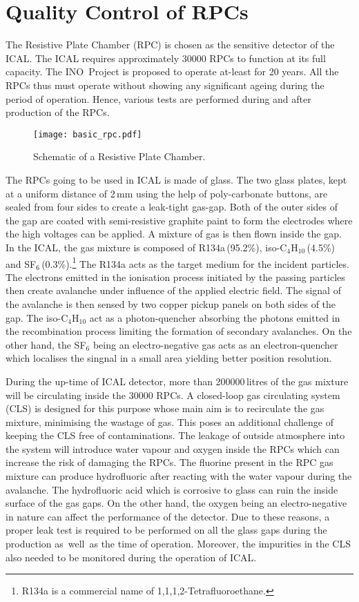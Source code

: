 \chapter{Quality Control of RPCs}
The Resistive Plate Chamber (RPC) is chosen as the sensitive detector of the ICAL. The ICAL requires approximately 30000 RPCs to function at its full capacity. The INO~Project is proposed to operate at-least for 20 years. All the RPCs thus must operate without showing any significant ageing during the period of operation. Hence, various tests are performed during and after production of the RPCs.
\begin{figure}[h]
  \centering
  \texttt{[image: basic\_rpc.pdf]}
  \caption{Schematic of a Resistive Plate Chamber.}
  \label{fig:rpc}
\end{figure}

The RPCs going to be used in ICAL is made of glass. The two glass plates, kept at a uniform distance of 2\,mm using the help of poly-carbonate buttons, are sealed from four sides to create a leak-tight gas-gap. Both of the outer sides of the gap are coated with semi-resistive graphite paint to form the electrodes where the high voltages can be applied. A mixture of gas is then flown inside the gap. In the ICAL, the gas mixture is composed of R134a\,(95.2\%), iso-C$_4$H$_{10}$\,(4.5\%) and SF$_6$\,(0.3\%).\footnote{R134a is a commercial name of 1,1,1,2-Tetrafluoroethane.} The R134a acts as the target medium for the incident particles. The electrons emitted in the ionisation process initiated by the passing particles then create avalanche under influence of the applied electric field. The signal of the avalanche is then sensed by two copper pickup panels on both sides of the gap. The iso-C$_4$H$_{10}$ act as a photon-quencher absorbing the photons emitted in the recombination process limiting the formation of secondary avalanches. On the other hand, the SF$_6$ being an electro-negative gas acts as an electron-quencher which localises the singnal in a small area yielding better position resolution.

During the up-time of ICAL detector, more than 200000\,litres of the gas mixture will be circulating inside the 30000 RPCs. A closed-loop gas circulating system (CLS) is designed for this purpose whose main aim is to recirculate the gas mixture, minimising the wastage of gas. This poses an additional challenge of keeping the CLS free of contaminations. The leakage of outside atmosphere into the system will introduce water vapour and oxygen inside the RPCs which can increase the risk of damaging the RPCs\cite{rpc_c,rpc_w}. The fluorine present in the RPC gas mixture can produce hydrofluoric after reacting with the water vapour during the avalanche. The hydrofluoric acid which is corrosive to glass can ruin the inside surface of the gas gaps. On the other hand, the oxygen being an electro-negative in nature can affect the performance of the detector. Due to these reasons, a proper leak test is required to be performed on all the glass gaps during the production as~well~as the time of operation. Moreover, the impurities in the CLS also needed to be monitored during the operation of ICAL.


